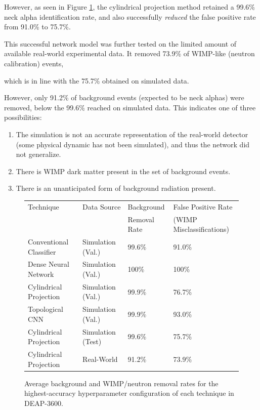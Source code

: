 \documentclass[12pt]{article}
\begin{document}
However, as seen in Figure \ref{deap_final_results}, the cylindrical projection method retained a 99.6\% neck alpha identification rate, and also successfully \textit{reduced} the false positive rate from 91.0\% to 75.7\%.

This successful network model was further tested on the limited amount of available real-world experimental data. It removed 73.9\% of WIMP-like (neutron calibration) events,

which is in line with the 75.7\% obtained on simulated data.

However, only 91.2\% of background events (expected to be neck alphas) were removed, below the 99.6\% reached on simulated data. This indicates one of three possibilities:

\begin{enumerate}
    \item The simulation is not an accurate representation of the real-world detector (some physical dynamic has not been simulated), and thus the network did not generalize.
    \item There is WIMP dark matter present in the set of background events.
    \item There is an unanticipated form of background radiation present.
\end{enumerate}

\begin{figure}[ht]
    \centering
    \begin{tabular}[b]{|l|l|l|l|}
        \hline
        \rowcolor{lightcyan}
        Technique & Data Source & Background & False Positive Rate \\
        \rowcolor{lightcyan}
        & & Removal Rate & (WIMP Misclassifications) \\
        \hline
        Conventional Classifier & Simulation (Val.) & 99.6\% & 91.0\% \\
        \hline
        Dense Neural Network & Simulation (Val.) & 100\% & 100\% \\
        \hline
        Cylindrical Projection & Simulation (Val.) & 99.9\% & 76.7\% \\
        \hline
        Topological CNN & Simulation (Val.) & 99.9\% & 93.0\% \\
        \hline
        Cylindrical Projection & Simulation (Test) & 99.6\% & 75.7\% \\
        \hline
        Cylindrical Projection & Real-World & 91.2\% & 73.9\% \\
        \hline
    \end{tabular}
    \caption{\label{deap_final_results} Average background and WIMP/neutron removal rates for the highest-accuracy hyperparameter configuration of each technique in DEAP-3600.}
\end{figure}
\end{document}
